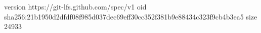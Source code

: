 version https://git-lfs.github.com/spec/v1
oid sha256:21b1950d2dfdf08f985d037dec69eff30cc352f381b9e88434c323f9cb4b3ea5
size 24933
